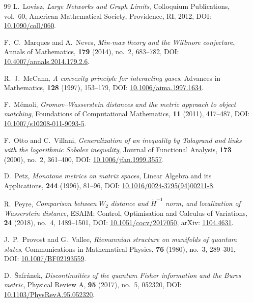\documentclass[11pt,a4paper,reqno]{amsart}
\theoremstyle{definition}
\numberwithin{equation}{section}
\begin{document}
\begin{thebibliography}{99}
L.~Lov{\'a}sz,
\emph{Large Networks and Graph Limits},
Colloquium Publications, vol.~60, American Mathematical Society, Providence, RI, 2012, DOI: \href{https://doi.org/10.1090/coll/060}{10.1090/coll/060}.

F.~C.~Marques and A.~Neves,
\emph{Min-max theory and the Willmore conjecture},
Annals of Mathematics, \textbf{179} (2014), no.~2, 683--782, DOI: \href{https://doi.org/10.4007/annals.2014.179.2.6}{10.4007/annals.2014.179.2.6}.

R.~J.~McCann,
\emph{A convexity principle for interacting gases},
Advances in Mathematics, \textbf{128} (1997), 153--179, DOI: \href{https://doi.org/10.1006/aima.1997.1634}{10.1006/aima.1997.1634}.

F.~M{\'e}moli,
\emph{Gromov--Wasserstein distances and the metric approach to object matching},
Foundations of Computational Mathematics, \textbf{11} (2011), 417--487, DOI: \href{https://doi.org/10.1007/s10208-011-9093-5}{10.1007/s10208-011-9093-5}.

F.~Otto and C.~Villani,
\emph{Generalization of an inequality by Talagrand and links with the logarithmic Sobolev inequality},
Journal of Functional Analysis, \textbf{173} (2000), no.~2, 361--400, DOI: \href{https://doi.org/10.1006/jfan.1999.3557}{10.1006/jfan.1999.3557}.

D.~Petz,
\emph{Monotone metrics on matrix spaces},
Linear Algebra and its Applications, \textbf{244} (1996), 81--96, DOI: \href{https://doi.org/10.1016/0024-3795(94)00211-8}{10.1016/0024-3795(94)00211-8}.

R.~Peyre,
\emph{Comparison between $W_2$ distance and $\dot{H}^{-1}$ norm, and localization of Wasserstein distance},
ESAIM: Control, Optimisation and Calculus of Variations, \textbf{24} (2018), no.~4, 1489--1501, DOI: \href{https://doi.org/10.1051/cocv/2017050}{10.1051/cocv/2017050}, arXiv: \href{https://arxiv.org/abs/1104.4631}{1104.4631}.

J.~P.~Provost and G.~Vallee,
\emph{Riemannian structure on manifolds of quantum states},
Communications in Mathematical Physics, \textbf{76} (1980), no.~3, 289--301, DOI: \href{https://doi.org/10.1007/BF02193559}{10.1007/BF02193559}.

D.~{\v{S}}afr{\'a}nek,
\emph{Discontinuities of the quantum Fisher information and the Bures metric},
Physical Review A, \textbf{95} (2017), no.~5, 052320, DOI: \href{https://doi.org/10.1103/PhysRevA.95.052320}{10.1103/PhysRevA.95.052320}.


\end{thebibliography}
\end{document}
